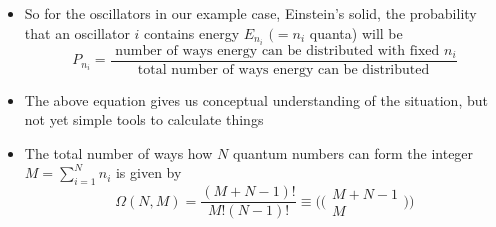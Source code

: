 \begin{frame}
\frametitle{\texorpdfstring{\culine[\sectiontitleulinecolor]{\sectiontitle}}{\sectiontitle} }

\begin{itemize}

\item So for the oscillators in our example case, Einstein's solid, the probability that an oscillator $i$ contains energy $E_{n_{i}}$ $(=n_{i} $ quanta) will be
\[
P_{n_{i}}=\frac{\text { number of ways energy can be distributed with fixed } n_{i}}{\text { total number of ways energy can be distributed }}
\]

\item The above equation gives us conceptual understanding of the situation, but not yet simple tools to calculate things

\item The total number of ways how $N$ quantum numbers can form the integer $M = \sum_{i=1}^N n_i$ is given by 
\[
\Omega(N, M)=\frac{(M+N-1) !}{M !(N-1) !} \equiv \textrm{((}\! \begin{array}{c}
M+N-1 \\
M
\end{array} \!\textrm{))}
\]

\end{itemize}

\endofslide 
\end{frame}


